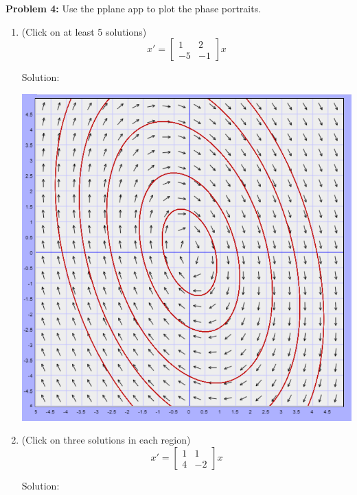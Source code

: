 \documentclass[12pt]{article}
\begin{document}
\pagebreak
\textbf{Problem 4:} Use the pplane app to plot the phase portraits.
\begin{enumerate}
    \item (Click on at least 5 solutions)
    \[x' = \begin{bmatrix}
        1 & 2\\
        -5 & -1
    \end{bmatrix}x\]

    Solution:

    \includegraphics{Images/pplane-a.png}

    \pagebreak

    \item (Click on three solutions in each region)
    \[x' = \begin{bmatrix}
        1 & 1\\
        4 & -2
    \end{bmatrix}x\]
        
    Solution:


\end{enumerate}
\end{document}

